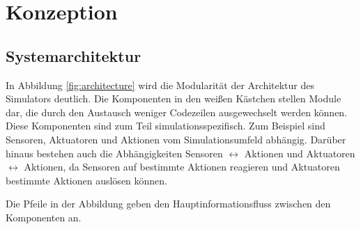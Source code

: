 \chapter{Konzeption}\label{chapter:concept}




\section{Systemarchitektur}\label{sec:architecture}

In Abbildung \ref{fig:architecture} wird die Modularität der Architektur des Simulators deutlich. Die Komponenten in den weißen Kästchen stellen Module dar, die durch den Austausch weniger Codezeilen ausgewechselt werden können. Diese Komponenten sind zum Teil simulationsspezifisch. Zum Beispiel sind Sensoren, Aktuatoren und Aktionen vom Simulationsumfeld abhängig. Darüber hinaus bestehen auch die Abhängigkeiten Sensoren $\leftrightarrow$ Aktionen und Aktuatoren $\leftrightarrow$ Aktionen, da Sensoren auf bestimmte Aktionen reagieren und Aktuatoren bestimmte Aktionen auslösen können.

Die Pfeile in der Abbildung geben den Hauptinformationsfluss zwischen den Komponenten an.


